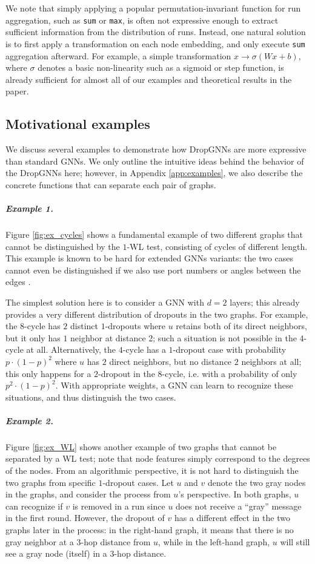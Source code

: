 \documentclass{article}
\begin{document}
We note that simply applying a popular permutation-invariant function for run aggregation, such as \texttt{sum} or \texttt{max}, is often not expressive enough to extract sufficient information from the distribution of runs. Instead, one natural solution is to first apply a transformation on each node embedding, and only execute \texttt{sum} aggregation afterward. For example, a simple transformation $x \rightarrow \sigma\left( W x + b \right)$, where $\sigma$ denotes a basic non-linearity such as a sigmoid or step function, is already sufficient for almost all of our examples and theoretical results in the paper.

\subsection{Motivational examples} \label{sec:examples}

We discuss several examples to demonstrate how DropGNNs are more expressive than standard GNNs. We only outline the intuitive ideas behind the behavior of the DropGNNs here; however, in Appendix \ref{app:examples}, we also describe the concrete functions that can separate each pair of graphs.

\subparagraph*{Example 1.} Figure \ref{fig:ex_cycles} shows a fundamental example of two different graphs that cannot be distinguished by the $1$-WL test, consisting of cycles of different length. This example is known to be hard for extended GNNs variants: the two cases cannot even be distinguished if we also use port numbers or angles between the edges \citep{limits}.

The simplest solution here is to consider a GNN with $d=2$ layers; this already provides a very different distribution of dropouts in the two graphs. For example, the $8$-cycle has $2$ distinct $1$-dropouts where $u$ retains both of its direct neighbors, but it only has $1$ neighbor at distance 2; such a situation is not possible in the $4$-cycle at all. Alternatively, the $4$-cycle has a $1$-dropout case with probability $p \cdot (1-p)^2$ where $u$ has $2$ direct neighbors, but no distance $2$ neighbors at all; this only happens for a $2$-dropout in the $8$-cycle, i.e. with a probability of only $p^2 \cdot (1-p)^2$. With appropriate weights, a GNN can learn to recognize these situations, and thus distinguish the two cases.

\subparagraph*{Example 2.} Figure \ref{fig:ex_WL} shows another example of two graphs that cannot be separated by a WL test; note that node features simply correspond to the degrees of the nodes. From an algorithmic perspective, it is not hard to distinguish the two graphs from specific $1$-dropout cases. Let $u$ and $v$ denote the two gray nodes in the graphs, and consider the process from $u$'s perspective. In both graphs, $u$ can recognize if $v$ is removed in a run since $u$ does not receive a ``gray'' message in the first round. However, the dropout of $v$ has a different effect in the two graphs later in the process: in the right-hand graph, it means that there is no gray neighbor at a $3$-hop distance from $u$, while in the left-hand graph, $u$ will still see a gray node (itself) in a $3$-hop distance.
\end{document}
